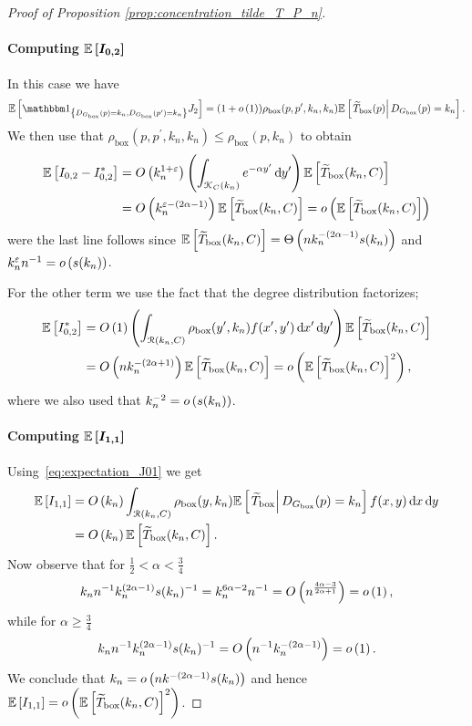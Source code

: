 \begin{proof}[Proof of Proposition \ref{prop:concentration_tilde_T_P_n}]
\paragraph{Computing $\bm{\mathbb{E}\left[I_{0,2}\right]}$} In this case we have
\[
	\Exp{\ind{\Dbox(p) = k_n, \Dbox(p^\prime) = k_n}J_2} = (1+\smallO{1})\rho_{\text{box}}(p,p^\prime,k_n,k_n)
	\CExp{\widetilde{T}_{\text{box}}(p)}{\Dbox(p) = k_n}.
\]
We then use that $\rho_{\text{box}}(p,p^\prime,k_n,k_n) \le \rho_{\text{box}}(p,k_n)$ to obtain
\begin{align*}
	\mathbb{E}\left[I_{0,2}-I_{0,2}^\ast\right] 
	&= O\left(k_n^{1+\varepsilon}\right) \left(\int_{{\mathcal K}_{C}(k_n)} e^{-\alpha y^\prime} \operatorname{\mathrm{d}\hspace{-2pt}} y^\prime\right) 
		\mathbb{E}\left[\widetilde{T}_{\text{box}}(k_n,C)\right]\\
	&= O\left(k_n^{\varepsilon -(2\alpha - 1)}\right)\mathbb{E}\left[\widetilde{T}_{\text{box}}(k_n,C)\right]
		= o\left(\mathbb{E}\left[\widetilde{T}_{\text{box}}(k_n,C)\right]\right)
\end{align*}
were the last line follows since $\mathbb{E}\left[\widetilde{T}_{\text{box}}(k_n,C)\right] = \Theta\left(n k_n^{-(2\alpha - 1)}s(k_n)\right)$ and $k_n^{\varepsilon}n^{-1} = o\left(s(k_n)\right)$.

For the other term we use the fact that the degree distribution factorizes;
\begin{align*}
	\mathbb{E}\left[I_{0,2}^\ast\right] 
	&= O\left(1\right)\left(\int_{{\mathcal R}(k_n,C)} \rho_{\text{box}}(y^\prime,k_n) f(x^\prime,y^\prime) 
		\operatorname{\mathrm{d}\hspace{-2pt}} x^\prime \operatorname{\mathrm{d}\hspace{-2pt}} y^\prime \right)\mathbb{E}\left[\widetilde{T}_{\text{box}}(k_n,C)\right]\\
	&= O\left(n k_n^{-(2\alpha + 1)}\right)\mathbb{E}\left[\widetilde{T}_{\text{box}}(k_n,C)\right]
		= o\left(\mathbb{E}\left[\widetilde{T}_{\text{box}}(k_n,C)\right]^2\right),
\end{align*}
where we also used that $k_n^{-2} = o\left(s(k_n)\right)$.

\paragraph{Computing $\bm{\mathbb{E}\left[I_{1,1}\right]}$}

Using~\eqref{eq:expectation_J01} we get
\begin{align*}
	\mathbb{E}\left[I_{1,1}\right]
	&= O\left(k_n\right) \int_{{\mathcal R}(k_n,C)} \rho_{\text{box}}(y,k_n) \mathbb{E}\left[\left.\widetilde{T}_{\text{box}}\right|D_{G_{\mathrm{box}}}(p) = k_n\right]
		f(x,y) \operatorname{\mathrm{d}\hspace{-2pt}} x \operatorname{\mathrm{d}\hspace{-2pt}} y\\
	&= O\left(k_n\right)\mathbb{E}\left[\widetilde{T}_{\text{box}}(k_n,C)\right].
\end{align*}
Now observe that for $\frac{1}{2} < \alpha < \frac{3}{4}$
\[
	k_n n^{-1} k_n^{(2\alpha -1)} s(k_n)^{-1} = k_n^{6\alpha - 2} n^{-1}
	= O\left(n^{\frac{4\alpha - 3}{2\alpha + 1}}\right) = o\left(1\right),
\]
while for $\alpha \ge \frac{3}{4}$
\[
	k_n  n^{-1} k_n^{(2\alpha -1)} s(k_n)^{-1} = O\left(n^{-1} k_n^{-(2\alpha - 1)}\right) = o\left(1\right).
\]
We conclude that $k_n = o\left(n k^{-(2\alpha - 1)}s(k_n)\right)$ and hence $\mathbb{E}\left[I_{1,1}\right] = o\left(\mathbb{E}\left[\widetilde{T}_{\text{box}}(k_n,C)\right]^2\right)$.


\end{proof}